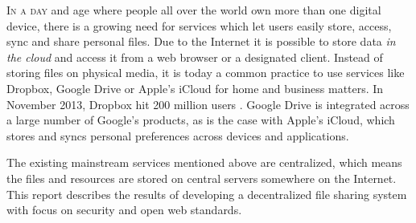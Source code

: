 \lettrine[lines=3]{I}{n a day} and age where people all over the world own more than one digital device, there is a growing need for services which let users easily store, access, sync and share personal files. Due to the Internet it is possible to store data \emph{in the cloud} and access it from a web browser or a designated client. Instead of storing files on physical media, it is today a common practice to use services like Dropbox, Google Drive or Apple's iCloud for home and business matters. In November 2013, Dropbox hit 200 million users \cite{Constine:2013:Online}. Google Drive is integrated across a large number of Google's products, as is the case with Apple's iCloud, which stores and syncs personal preferences across devices and applications.

The existing mainstream services mentioned above are centralized, which means the files and resources are stored on central servers somewhere on the Internet. This report describes the results of developing a decentralized file sharing system with focus on security and open web standards.







